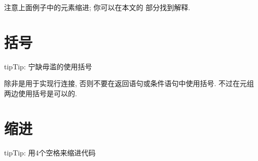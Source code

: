 \documentclass[a4paper,10pt,english]{sphinxmanual}
\begin{document}
注意上面例子中的元素缩进; 你可以在本文的 {\hyperref[\detokenize{python_style_rules:indentation}]{}} 部分找到解释.


\section{括号}
\label{\detokenize{python_style_rules:id4}}
\begin{sphinxadmonition}{tip}{Tip:}
宁缺毋滥的使用括号
\end{sphinxadmonition}

除非是用于实现行连接, 否则不要在返回语句或条件语句中使用括号. 不过在元组两边使用括号是可以的.

%
\begin{sphinxVerbatim}[commandchars=\\\{\}]
  
      
           
        
       
      
          
\end{sphinxVerbatim}

%
\begin{sphinxVerbatim}[commandchars=\\\{\}]
   
      
      
\end{sphinxVerbatim}


\section{缩进}
\label{\detokenize{python_style_rules:indentation}}\label{\detokenize{python_style_rules:id5}}
\begin{sphinxadmonition}{tip}{Tip:}
用4个空格来缩进代码
\end{sphinxadmonition}
\end{document}
